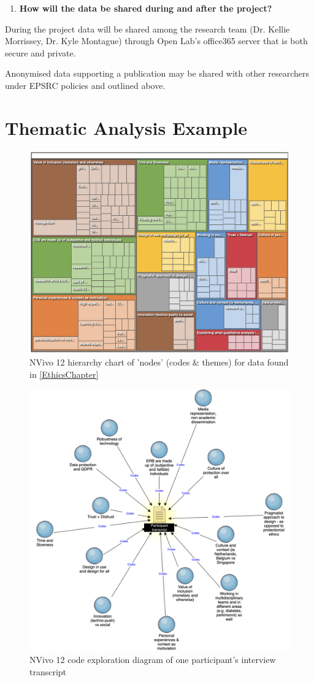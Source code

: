 \begin{enumerate}[resume]
\item \textbf{How will the data be shared during and after the project?} 
\end{enumerate}
During the project data will be shared among the research team (Dr. Kellie Morrissey, Dr. Kyle Montague) through Open Lab’s office365 server that is both secure and private. 

Anonymised data supporting a publication may be shared with other researchers under EPSRC policies and outlined above. 



\newpage
\section{Thematic Analysis Example}
\label{app:TA}

\begin{figure}[htp]
    \centering
    \includegraphics[width=0.6\linewidth]{Images/Appendix/Analysis/Codebook_Overview.png}
    \caption{NVivo 12 hierarchy chart of 'nodes' (codes \& themes) for data found in \ref{EthicsChapter}}
    \label{fig:App:TA-Codebook}
\end{figure}

\begin{figure}[htp]
    \centering
    \includegraphics[width=0.6\linewidth]{Images/Appendix/Analysis/ParticipantTranscriptCoding.png}
    \caption{NVivo 12 code exploration diagram of one participant's interview transcript}
    \label{fig:App:TA-TranscriptCoding}
\end{figure}

